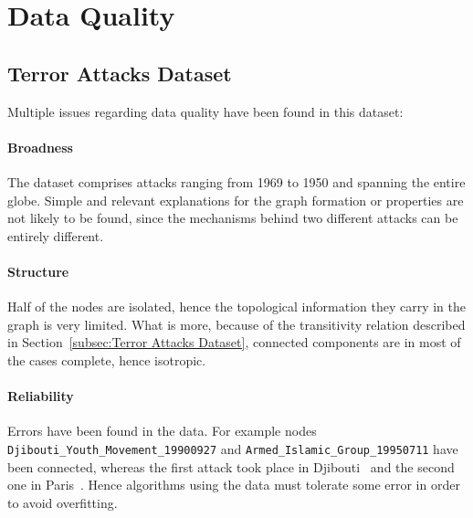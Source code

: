 \section{Data Quality}
\label{sec:DataQuality}

\subsection{Terror Attacks Dataset}
Multiple issues regarding data quality have been found in this dataset:

\paragraph{Broadness} 
The dataset comprises attacks ranging from 1969 to 1950 and spanning the entire globe. Simple and relevant explanations for the graph formation or properties are not likely to be found, since the mechanisms behind two different attacks can be entirely different.

\paragraph{Structure} 
Half of the nodes are isolated, hence the topological information they carry in the graph is very limited. What is more, because of the transitivity relation described in Section~\ref{subsec:Terror Attacks Dataset}, connected components are in most of the cases complete, hence isotropic. 

\paragraph{Reliability} 
Errors have been found in the data. For example nodes
 \texttt{Djibouti\_Youth\_Movement\_19900927} 
 and 
 \texttt{Armed\_Islamic\_Group\_19950711} 
 have been connected, whereas the first attack took place in Djibouti~\cite{amnesty1991} and the second one in Paris~\cite{nouvelObs2007}. Hence algorithms using the data must tolerate some error in order to avoid overfitting.
